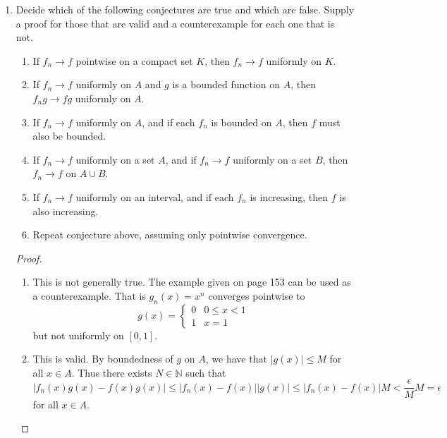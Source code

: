 \begin{enumerate}
    \item Decide which of the following conjectures are true and which are false. Supply a proof for those that are valid and a counterexample for each one that is not.
    \begin{enumerate}
        \item If \( f_n \rightarrow f \) pointwise on a compact set \( K \), then \( f_n \rightarrow f \) uniformly on \( K \).
        
        \item If \( f_n \rightarrow f \) uniformly on \( A \) and \( g \) is a bounded function on \( A \), then \( f_ng \rightarrow fg \) uniformly on \( A \).
        
        \item If \( f_n \rightarrow f \) uniformly on \( A \), and if each \( f_n \) is bounded on \( A \), then \( f \) must also be bounded.
        
        \item If \( f_n \rightarrow f \) uniformly on a set \( A \), and if \( f_n \rightarrow f \) uniformly on a set \( B \), then \( f_n \rightarrow f \) on \( A \cup B \). 
        
        \item If \( f_n \rightarrow f \) uniformly on an interval, and if each \( f_n \) is increasing, then \( f \) is also increasing.
        
        \item Repeat conjecture above, assuming only pointwise convergence.
    \end{enumerate}
    
    \begin{proof}
    \begin{enumerate}
        \item This is not generally true. The example given on page 153 can be used as a counterexample. That is \( g_n(x) = x^n \) converges pointwise to 
        \[
        g(x) = \begin{cases} 0 & 0 \leq x < 1 \\ 1 & x = 1 \end{cases}
        \]
        but not uniformly on \( [0,1] \). 
        
        \item This is valid. By boundedness of \( g \) on \( A \), we have that \( \vert g(x) \vert \leq M \) for all \( x \in A \). Thus there exists \( N \in \mathbb{N} \) such that 
        \[
        \vert f_n(x)g(x) - f(x)g(x) \vert \leq \vert f_n(x) - f(x) \vert \vert g(x) \vert \leq \vert f_n(x) - f(x) \vert M < \frac{\epsilon}{M}M = \epsilon
        \]
        for all \( x \in A \).
        

\end{enumerate}
\end{proof}
\end{enumerate}

